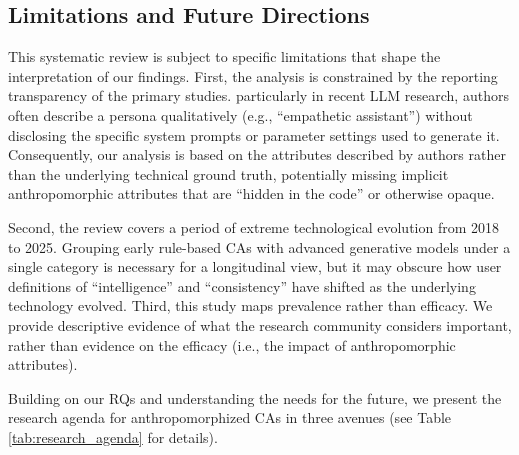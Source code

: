 \documentclass[manuscript,anonymous,sigconf]{acmart}
\begin{document}
\subsection{Limitations and Future Directions}

This systematic review is subject to specific limitations that shape the interpretation of our findings. First, the analysis is constrained by the reporting transparency of the primary studies. particularly in recent LLM research, authors often describe a persona qualitatively (e.g., ``empathetic assistant'') without disclosing the specific system prompts or parameter settings used to generate it. Consequently, our analysis is based on the attributes described by authors rather than the underlying technical ground truth, potentially missing implicit anthropomorphic attributes that are ``hidden in the code'' or otherwise opaque. 

Second, the review covers a period of extreme technological evolution from 2018 to 2025. Grouping early rule-based CAs with advanced generative models under a single category is necessary for a longitudinal view, but it may obscure how user definitions of ``intelligence'' and ``consistency'' have shifted as the underlying technology evolved. Third, this study maps prevalence rather than efficacy. We provide descriptive evidence of what the research community considers important, rather than evidence on the efficacy (i.e., the impact of anthropomorphic attributes).

Building on our RQs and understanding the needs for the future, we present the research agenda for anthropomorphized CAs in three avenues (see Table \ref{tab:research_agenda} for details).
\end{document}
